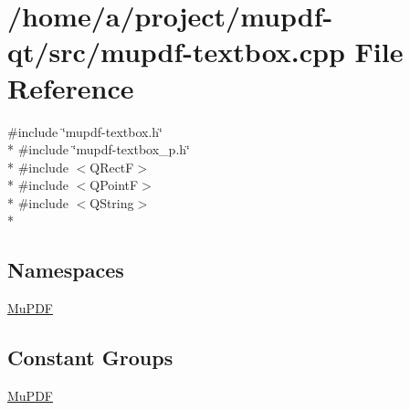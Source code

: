 \hypertarget{mupdf-textbox_8cpp}{\section{/home/a/project/mupdf-\/qt/src/mupdf-\/textbox.cpp File Reference}
\label{mupdf-textbox_8cpp}
}
{\ttfamily \#include \char`\"{}mupdf-\/textbox.\-h\char`\"{}}\\*
{\ttfamily \#include \char`\"{}mupdf-\/textbox\-\_\-p.\-h\char`\"{}}\\*
{\ttfamily \#include $<$Q\-Rect\-F$>$}\\*
{\ttfamily \#include $<$Q\-Point\-F$>$}\\*
{\ttfamily \#include $<$Q\-String$>$}\\*
\subsection*{Namespaces}
\begin{DoxyCompactItemize}
\item 
\hyperlink{namespace_mu_p_d_f}{Mu\-P\-D\-F}
\end{DoxyCompactItemize}
\subsection*{Constant Groups}
\begin{DoxyCompactItemize}
\item 
\hyperlink{namespace_mu_p_d_f}{Mu\-P\-D\-F}
\end{DoxyCompactItemize}

